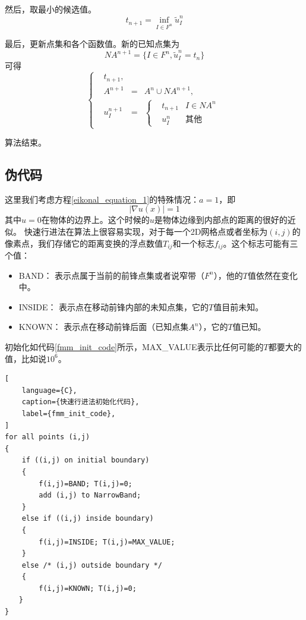 然后，取最小的候选值。
\begin{equation*}
    \label{min_tn+1}
    t_{n+1} = \underset{I \in F^n}{\inf} \widetilde{u}^n_I
\end{equation*}

最后，更新点集和各个函数值。新的已知点集为
\begin{equation*}
    \label{new_an+1}
    NA^{n+1} = \{I \in F^n, \widetilde{u}^n_I = t_n\}
\end{equation*}
可得
\begin{equation*}
    \label{new_values}
    \left\{
    \begin{aligned}
    & t_{n+1},\\
    & A^{n+1} & = & A^n \cup NA^{n+1}, \\
    & u^{n+1}_I & = & \left\{
        \begin{aligned}
        & t_{n+1} & I \in NA^n \\
        & u^n_I & \mbox{其他}
        \end{aligned}
        \right.
    \end{aligned}
    \right.
\end{equation*}

算法结束。

\subsection{伪代码}
这里我们考虑方程\ref{eikonal_equation_1}的特殊情况：$a = 1$，即
\begin{equation}
    \label{special_eikonal_equation}
    \left| \nabla u(x) \right| = 1
\end{equation}
其中$u = 0$在物体的边界上。这个时候的$u$是物体边缘到内部点的距离的很好的近似。
快速行进法在算法上很容易实现，对于每一个2D网格点或者坐标为$(i, j)$的像素点，我们存储它的距离变换的浮点数值$T_{ij}$和一个标志$f_{ij}$。这个标志可能有三个值：
\begin{itemize}
\item BAND： 表示点属于当前的前锋点集或者说窄带（$F^n$），他的$T$值依然在变化中。
\item INSIDE： 表示点在移动前锋内部的未知点集，它的$T$值目前未知。
\item KNOWN： 表示点在移动前锋后面（已知点集$A^n$），它的$T$值已知。
\end{itemize}

初始化如代码\ref{fmm_init_code}所示，MAX\_VALUE表示比任何可能的$T$都要大的值，比如说$10^6$。
\begin{lstlisting}[
    language={C},
    caption={快速行进法初始化代码},
    label={fmm_init_code},
]
for all points (i,j)
{
    if ((i,j) on initial boundary)
    {
        f(i,j)=BAND; T(i,j)=0;
        add (i,j) to NarrowBand;
    }
    else if ((i,j) inside boundary)
    {
        f(i,j)=INSIDE; T(i,j)=MAX_VALUE;
    }
    else /* (i,j) outside boundary */
    {
        f(i,j)=KNOWN; T(i,j)=0;
　　}
}
\end{lstlisting}

